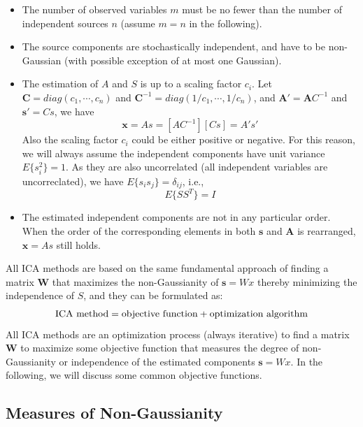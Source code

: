\documentclass[12pt, a4paper, onecolumn]{IEEEtran}
\begin{document}
\begin{itemize}
\item The number of observed variables $m$ must be no fewer than the number
	of independent sources $n$ (assume $m=n$ in the following).
\item The source components are stochastically independent, and have to be
	non-Gaussian (with possible exception of at most one Gaussian).
\item The estimation of $A$ and $S$ is up to a scaling factor $c_i$.
	Let ${\mathbf C}=diag(c_1,\cdots,c_n)$ and ${\mathbf C}^{-1}=
	diag(1/c_1,\cdots,1/c_n)$,
	and ${\mathbf A}'={\mathbf AC}^{-1}$ and ${\mathbf s'=Cs}$, we have
\[	{\mathbf x=As=[AC^{-1}][Cs]=A's'}	\]
	Also the scaling factor $c_i$ could be either positive or negative.
	For this reason, we will always assume the independent components
	have unit variance $E\{s_i^2\}=1$. As they are also uncorrelated
	(all independent variables are uncorreclated), we have
	$E\{s_is_j\}=\delta_{ij}$, i.e.,
\[	E\{SS^T\}=I	\]
\item The estimated independent components are not in any particular
	order. When the order of the corresponding elements in both
	${\mathbf s}$ and ${\mathbf A}$ is rearranged, ${\mathbf x=As}$
	still holds.
\end{itemize}

All ICA methods are based on the same fundamental approach of finding a
matrix ${\mathbf W}$ that maximizes the non-Gaussianity of ${\mathbf s=Wx}$
thereby minimizing the independence of $S$, and they can be formulated as:
\[ {\bf
\mbox{ICA method}=\mbox{objective function}+\mbox{optimization algorithm}
} \]
All ICA methods are an optimization process (always iterative) to find a
matrix ${\mathbf W}$ to maximize some objective function that measures the
degree of non-Gaussianity or independence of the estimated components
${\mathbf s=Wx}$. In the following, we will discuss some common objective
functions.

\subsection*{Measures of Non-Gaussianity}
\end{document}
